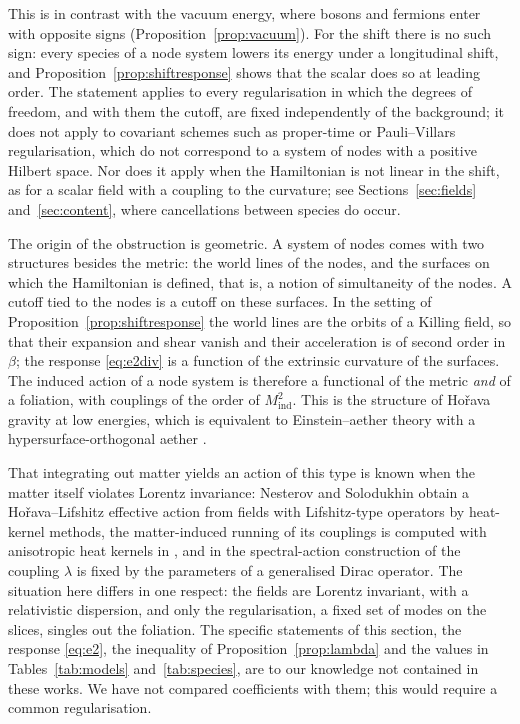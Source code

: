 \documentclass[11pt,a4paper]{article}
\theoremstyle{stmt}
\theoremstyle{defn}
\theoremstyle{rmk}
\numberwithin{equation}{section}
\begin{document}
This is in contrast with the vacuum energy, where bosons and fermions enter with opposite signs (Proposition~\ref{prop:vacuum}). For the shift there is no such sign: every species of a node system lowers its energy under a longitudinal shift, and Proposition~\ref{prop:shiftresponse} shows that the scalar does so at leading order. The statement applies to every regularisation in which the degrees of freedom, and with them the cutoff, are fixed independently of the background; it does not apply to covariant schemes such as proper-time or Pauli--Villars regularisation, which do not correspond to a system of nodes with a positive Hilbert space. Nor does it apply when the Hamiltonian is not linear in the shift, as for a scalar field with a coupling to the curvature; see Sections~\ref{sec:fields} and~\ref{sec:content}, where cancellations between species do occur.

The origin of the obstruction is geometric. A system of nodes comes with two structures besides the metric: the world lines of the nodes, and the surfaces on which the Hamiltonian is defined, that is, a notion of simultaneity of the nodes. A cutoff tied to the nodes is a cutoff on these surfaces. In the setting of Proposition~\ref{prop:shiftresponse} the world lines are the orbits of a Killing field, so that their expansion and shear vanish and their acceleration is of second order in $\beta$; the response \eqref{eq:e2div} is a function of the extrinsic curvature of the surfaces. The induced action of a node system is therefore a functional of the metric \emph{and} of a foliation, with couplings of the order of $M_{\mathrm{ind}}^2$. This is the structure of Ho\v{r}ava gravity \cite{Horava} at low energies, which is equivalent to Einstein--aether theory \cite{JacobsonMattingly} with a hypersurface-orthogonal aether \cite{Jacobson10}.

That integrating out matter yields an action of this type is known when the matter itself violates Lorentz invariance: Nesterov and Solodukhin \cite{NS10} obtain a Ho\v{r}ava--Lifshitz effective action from fields with Lifshitz-type operators by heat-kernel methods, the matter-induced running of its couplings is computed with anisotropic heat kernels in \cite{DSS}, and in the spectral-action construction of \cite{LMP} the coupling $\lambda$ is fixed by the parameters of a generalised Dirac operator. The situation here differs in one respect: the fields are Lorentz invariant, with a relativistic dispersion, and only the regularisation, a fixed set of modes on the slices, singles out the foliation. The specific statements of this section, the response \eqref{eq:e2}, the inequality of Proposition~\ref{prop:lambda} and the values in Tables~\ref{tab:models} and~\ref{tab:species}, are to our knowledge not contained in these works. We have not compared coefficients with them; this would require a common regularisation.
\end{document}
